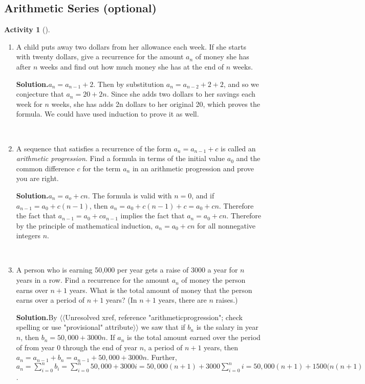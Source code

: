 \documentclass[10pt,]{book}
\theoremstyle{plain}
\theoremstyle{definition}
\newtheorem{activity}[project]{Activity}
\numberwithin{equation}{chapter}
\begin{document}
\typeout{************************************************}
\typeout{************************************************}
\subsection[{Arithmetic Series (optional)}]{Arithmetic Series (optional)}\label{subsection-12}
\begin{activity}[]\label{childsaving}
~\par
\begin{enumerate}[label=(\alph*)]
 \item A child puts away two dollars from her allowance each week. If she starts with twenty dollars, give a recurrence for the amount \(a_n\) of money she has after \(n\) weeks and find out how much money she has at the end of \(n\) weeks.%
\par\medskip\noindent%
\textbf{Solution.}\quad \(a_n=a_{n-1} +2\). Then by substitution \(a_n=a_{n-2}+2+2\), and so we conjecture that \(a_n = 20 +2n\). Since she adds two dollars to her savings each week for \(n\) weeks, she has adds 2n dollars to her original 20, which proves the formula. We could have used induction to prove it as well.%

~\par
\item A sequence that satisfies a recurrence of the form \(a_n=a_{n-1} +c\) is called an \emph{arithmetic progression}. Find a formula in terms of the initial value \(a_0\) and the common difference \(c\) for the term \(a_n\) in an arithmetic progression and prove you are right.%
\par\medskip\noindent%
\textbf{Solution.}\quad \(a_n =a_o+cn\). The formula is valid with \(n=0\), and if \(a_{n-1}=a_0
+c(n-1)\), then \(a_n = a_0 +c(n-1) +c =a_0+cn\). Therefore the fact that \(a_{n-1}=a_0+ca_{n-1}\) implies the fact that \(a_n=a_0+cn\). Therefore by the principle of mathematical induction, \(a_n=a_0+cn\) for all nonnegative integers \(n\).%

~\par
\item A person who is earning \textdollar{}50,000 per year gets a raise of \textdollar{}3000 a year for \(n\) years in a row. Find a recurrence for the amount \(a_n\) of money the person earns over \(n+1\) years. What is the total amount of money that the person earns over a period of \(n+1\) years? (In \(n+1\) years, there are \(n\) raises.)%
\par\medskip\noindent%
\textbf{Solution.}\quad By {$\langle\langle$Unresolved xref, reference "arithmeticprogression"; check spelling or use "provisional" attribute$\rangle\rangle$} we saw that if \(b_n\) is the salary in year \(n\), then \(b_n=50,000 + 3000n\). If \(a_n\) is the total amount earned over the period of from year 0 through the end of year \(n\), a period of \(n+1\) years, then \(a_n=a_{n-1}+b_n=a_{n-1}+ 50,000+3000n\). Further, \(a_n=\sum_{i=0}^n b_i=\sum_{i=0}^n50,000 +3000i = 50,000(n+1)+3000\sum_{i=0}^n
i= 50,000(n+1) + 1500(n(n+1)\).%


\end{enumerate}
\end{activity}
\end{document}
